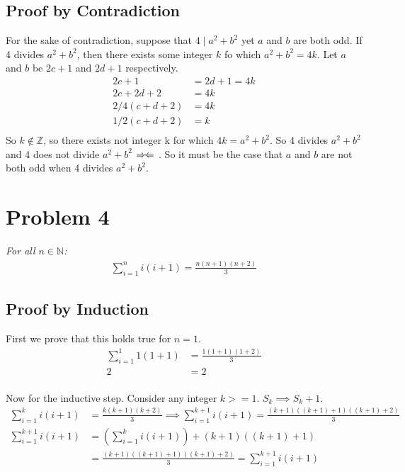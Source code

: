 \documentclass{article}
\newcommand{\contradiction}{%
  \ensuremath{{\Rightarrow\mspace{-2mu}\Leftarrow}}%
}
\begin{document}
		\subsection{Proof by Contradiction} For the sake of contradiction, suppose that $4 \mid a^2 + b^2$ yet $a$ and $b$ are both odd. If 4 divides $a^2 + b^2$, then there exists some integer $k$ fo which $a^2 + b^2 = 4k$. Let $a$ and $b$ be $2c + 1$ and $2d + 1$ respectively. 
		\begin{align*}
		2c +1 &= 2d + 1 = 4k\\
		2c + 2d + 2 &= 4k\\
		2/4(c + d + 2) &= 4k\\
		1/2(c + d + 2) &= k\\
		\end{align*}
		So $k \notin \mathbb{Z}$, so there exists not integer k for which $4k = a^2 + b^2$. So 4 divides $a^2 + b^2$ and 4 does not divide $a^2 + b^2$ \contradiction. So it must be the case that $a$ and $b$ are not both odd when 4 divides $a^2 + b^2$.
		
	\section{Problem 4} \textit{For all $n \in \mathbb{N}$:} 
	\begin{align*}
	\sum_{i=1}^{n} i(i + 1) = \frac{n(n + 1)(n + 2)}{3}
	\end{align*}
		\subsection{Proof by Induction} First we prove that this holds true for $n = 1$.
		\begin{align*}
		\sum_{i=1}^{1} 1(1 + 1) &= \frac{1(1 + 1)(1 + 2)}{3}\\
		2 &= 2\\
		\end{align*}
		
		Now for the inductive step. Consider any integer $k >= 1$. $S_k \implies S_k + 1$.	
		\begin{align*}
		\sum_{i=1}^{k} i(i + 1) &= \frac{k(k + 1)(k + 2)}{3} \implies \sum_{i=1}^{k + 1} i(i + 1) = \frac{(k + 1)((k + 1) + 1)((k + 1) + 2)}{3}\\
		\sum_{i=1}^{k + 1} i(i + 1) &= (\sum_{i=1}^{k} i(i + 1)) + (k + 1)((k + 1) + 1)\\
		&= \frac{(k + 1)((k + 1) + 1)((k + 1) + 2)}{3} = \sum_{i=1}^{k + 1} i(i + 1)\\			
		\end{align*}	
		
\end{document}

